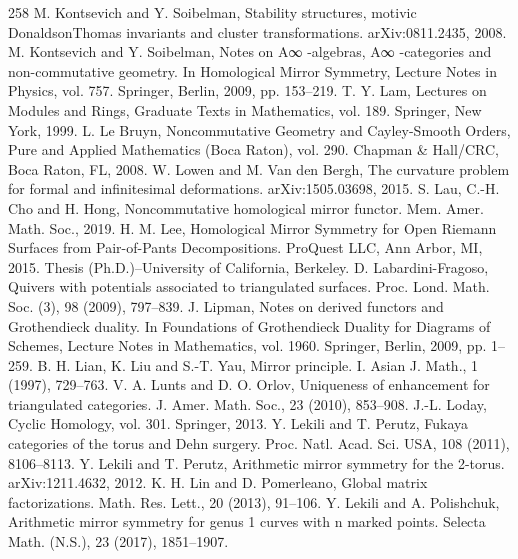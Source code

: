\begin{thebibliography}{258}
\hypertarget{ref:149}{} M. Kontsevich and Y. Soibelman, Stability structures, motivic DonaldsonThomas invariants and cluster transformations. arXiv:0811.2435, 2008.
\hypertarget{ref:150}{} M. Kontsevich and Y. Soibelman, Notes on A∞ -algebras, A∞ -categories and non-commutative geometry. In Homological Mirror Symmetry, Lecture Notes in Physics, vol. 757. Springer, Berlin, 2009, pp. 153–219.
\hypertarget{ref:151}{} T. Y. Lam, Lectures on Modules and Rings, Graduate Texts in Mathematics, vol. 189. Springer, New York, 1999.
\hypertarget{ref:152}{} L. Le Bruyn, Noncommutative Geometry and Cayley-Smooth Orders, Pure and Applied Mathematics (Boca Raton), vol. 290. Chapman \& Hall/CRC, Boca Raton, FL, 2008.
\hypertarget{ref:153}{} W. Lowen and M. Van den Bergh, The curvature problem for formal and infinitesimal deformations. arXiv:1505.03698, 2015.
\hypertarget{ref:154}{} S. Lau, C.-H. Cho and H. Hong, Noncommutative homological mirror functor. Mem. Amer. Math. Soc., 2019.
\hypertarget{ref:155}{} H. M. Lee, Homological Mirror Symmetry for Open Riemann Surfaces from Pair-of-Pants Decompositions. ProQuest LLC, Ann Arbor, MI, 2015. Thesis (Ph.D.)–University of California, Berkeley.
\hypertarget{ref:156}{} D. Labardini-Fragoso, Quivers with potentials associated to triangulated surfaces. Proc. Lond. Math. Soc. (3), 98 (2009), 797–839.
\hypertarget{ref:157}{} J. Lipman, Notes on derived functors and Grothendieck duality. In Foundations of Grothendieck Duality for Diagrams of Schemes, Lecture Notes in Mathematics, vol. 1960. Springer, Berlin, 2009, pp. 1–259.
\hypertarget{ref:158}{} B. H. Lian, K. Liu and S.-T. Yau, Mirror principle. I. Asian J. Math., 1 (1997), 729–763.
\hypertarget{ref:159}{} V. A. Lunts and D. O. Orlov, Uniqueness of enhancement for triangulated categories. J. Amer. Math. Soc., 23 (2010), 853–908.
\hypertarget{ref:160}{} J.-L. Loday, Cyclic Homology, vol. 301. Springer, 2013.
\hypertarget{ref:161}{} Y. Lekili and T. Perutz, Fukaya categories of the torus and Dehn surgery. Proc. Natl. Acad. Sci. USA, 108 (2011), 8106–8113.
\hypertarget{ref:162}{} Y. Lekili and T. Perutz, Arithmetic mirror symmetry for the 2-torus. arXiv:1211.4632, 2012.
\hypertarget{ref:163}{} K. H. Lin and D. Pomerleano, Global matrix factorizations. Math. Res. Lett., 20 (2013), 91–106.
\hypertarget{ref:164}{} Y. Lekili and A. Polishchuk, Arithmetic mirror symmetry for genus 1 curves with n marked points. Selecta Math. (N.S.), 23 (2017), 1851–1907.

\end{thebibliography}
